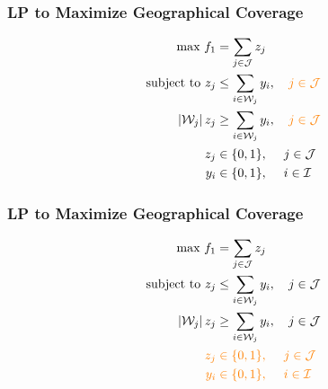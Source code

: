 \documentclass[10pt, compress]{beamer}
\begin{document}
\begin{frame}[fragile]
\frametitle{LP to Maximize Geographical Coverage}
\noindent{}
\begin{align*}
\textrm{max } f_1 &= \sum_{j \in \mathcal{J}} z_j \\
\textrm{subject to } z_j &\leq \sum_{ i \in \mathcal{W}_j} y_i, \quad \color{orange} j \in \mathcal{J}\\
\left|\mathcal{W}_j\right|z_j &\geq \sum_{i \in \mathcal{W}_j} y_i, \quad \color{orange} j \in \mathcal{J} \\
z_j &\in \{0,1\}, \quad \; j \in \mathcal{J} \\
y_i &\in \{0,1\}, \quad \; i \in \mathcal{I}
\end{align*}
\end{frame}

\begin{frame}[fragile]
\frametitle{LP to Maximize Geographical Coverage}
\noindent{}
\begin{align*}
\textrm{max } f_1 &= \sum_{j \in \mathcal{J}} z_j \\
\textrm{subject to } z_j &\leq \sum_{i \in \mathcal{W}_j} y_i, \quad j \in \mathcal{J}\\
\left|\mathcal{W}_j\right|z_j &\geq \sum_{i \in \mathcal{W}_j} y_i, \quad j \in \mathcal{J} \\
\color{orange} z_j &\color{orange} \in \{0,1\}, \quad \; j \in \mathcal{J} \\
\color{orange} y_i &\color{orange} \in \{0,1\}, \quad \; i \in \mathcal{I}
\end{align*}
\end{frame}
\end{document}
